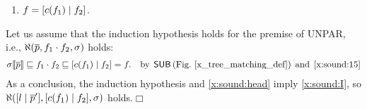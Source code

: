 \begin{enumerate}
\begin{enumerate}
         \item \label{x:sound:15} \(f = \cons{c(f_1)}{f_2}\).
       
       \end{enumerate}
       Let us assume that the induction hypothesis holds for the
       premise of \textsf{UNPAR}, i.e., \(\ind{R}(\overline{p}, f_1
       \cdot f_2, \sigma)\) holds:
       \begin{align}
         \subst{\overline{p}}{\sigma} &\sqsubseteq f_1 \cdot f_2
          \sqsubseteq \cons{c(f_1)}{f_2} = f.
          &\text{by} \,\; \textsf{SUB} \,
         \text{(Fig.~\ref{x_tree_matching_def})} \,\;
           \text{and} \,\; \text{\ref{x:sound:15}}\label{x:sound:I}
       \end{align}
        As a conclusion, the induction hypothesis and
        \eqref{x:sound:head} imply \eqref{x:sound:I}, so
        \(\ind{R}(\cons{l}{\overline{p}'}, \cons{c(f_1)}{f_2},
        \sigma)\) holds.\hfill \(\Box\)

\end{enumerate}
